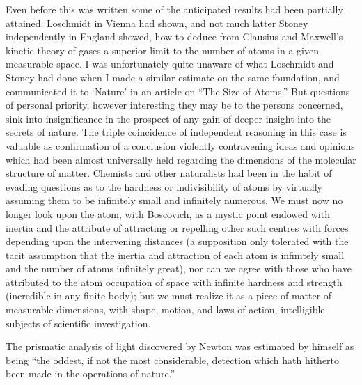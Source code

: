 \documentclass[a4paper, 11pt, oneside, english]{article}
\begin{document}
Even before this was written some of the anticipated results had been partially attained. Loschmidt in Vienna had shown, and not much latter Stoney independently in England showed, how to deduce from Clausius and Maxwell's kinetic theory of gases a superior limit to the number of atoms in a given measurable space. I was unfortunately quite unaware of what Loschmidt and Stoney had done when I made a similar estimate on the same foundation, and communicated it to `Nature' in an article on ``The Size of Atoms.'' But questions of personal priority, however interesting they may be to the persons concerned, sink into insignificance in the prospect of any gain of deeper insight into the secrets of nature. The triple coincidence of independent reasoning in this case is valuable as confirmation of a conclusion violently contravening ideas and opinions which had been almost universally held regarding the dimensions of the molecular structure of matter. Chemists and other naturalists had been in the habit of evading questions as to the hardness or indivisibility of atoms by virtually assuming them to be infinitely small and infinitely numerous. We must now no longer look upon the atom, with Boscovich, as a mystic point endowed with inertia and the attribute of attracting or repelling other such centres with forces depending upon the intervening distances (a supposition only tolerated with the tacit assumption that the inertia and attraction of each atom is infinitely small and the number of atoms infinitely great), nor can we agree with those who have attributed to the atom occupation of space with infinite hardness and strength (incredible in any finite body); but we must realize it as a piece of matter of measurable dimensions, with shape, motion, and laws of action, intelligible subjects of scientific investigation.

The prismatic analysis of light discovered by Newton was estimated by himself as being ``the oddest, if not the most considerable, detection which hath hitherto been made in the operations of nature.''
\end{document}
